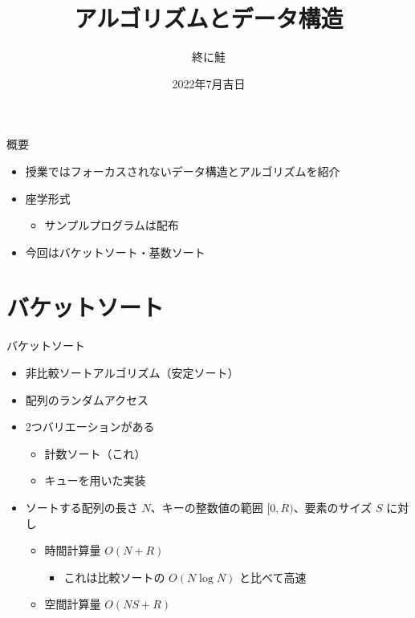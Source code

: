 \documentclass[t,aspectratio=169,autodetect-engine,ja=standard]{beamer}
\title{アルゴリズムとデータ構造}
\author{終に鮭}
\institute{電子計算機研究会}
\date[2022/7/xx]{2022年7月吉日}
\begin{document}
\frame{\titlepage}

\begin{frame}{概要}
\begin{itemize}
    \item 授業ではフォーカスされないデータ構造とアルゴリズムを紹介
    \item 座学形式
        \begin{itemize}
            \item サンプルプログラムは配布
        \end{itemize}
    \item 今回はバケットソート・基数ソート
\end{itemize}
\end{frame}

\section{バケットソート}
\frame{\sectionpage}

\begin{frame}{バケットソート}
\begin{itemize}
    \item 非比較ソートアルゴリズム（安定ソート）
    \item 配列のランダムアクセス
    \item 2つバリエーションがある
        \begin{itemize}
            \item 計数ソート（これ）
            \item キューを用いた実装
        \end{itemize}
    \item ソートする配列の長さ $N$、キーの整数値の範囲 $[0,R)$、要素のサイズ $S$ に対し
        \begin{itemize}
            \item 時間計算量 $O(N+R)$
                \begin{itemize}
                    \item これは比較ソートの $O(N \log N)$ と比べて高速
                \end{itemize}
            \item 空間計算量 $O(NS+R)$
        \end{itemize}
\end{itemize}
\end{frame}
\end{document}
